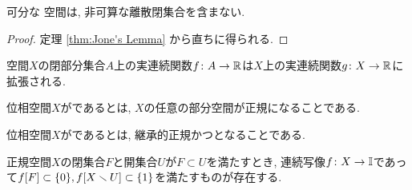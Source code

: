 \documentclass[uplatex, dvipdfmx, a4paper, 12pt, class=jsbook, crop=false]{standalone}
\begin{document}
\begin{corollary}
	\label{coro:Corollary of Jone's Lamma}
	可分な  空間は, 非可算な離散閉集合を含まない.
\end{corollary}

\begin{proof}
	定理 \ref{thm:Jone's Lemma} から直ちに得られる.
\end{proof}

\begin{theorem}[\Tietze]
	\label{thm:Tietze's extension theorem}
	 空間$ X $の閉部分集合$ A $上の実連続関数$ f \colon A \to \mathbb{R} $は$ X $上の実連続関数$ g \colon X \to \mathbb{R} $に拡張される.
\end{theorem}

\begin{definition}
	位相空間$ X $がであるとは, $ X $の任意の部分空間が正規になることである.
\end{definition}

\begin{definition}
	位相空間$ X $がであるとは, 継承的正規かつとなることである.
\end{definition}

\begin{theorem}
	\label{T400003}
	正規空間\( X \)の閉集合\( F \)と開集合\( U \)が\( F \subset U \)を満たすとき,
	連続写像\( f\colon X\to\mathbb{I} \)であって\( \mapset{f}{F} \subset \lrbrace{0},
	\mapset{f}{X \setminus U} \subset \lrbrace{1} \)を満たすものが存在する.
\end{theorem}
\end{document}
